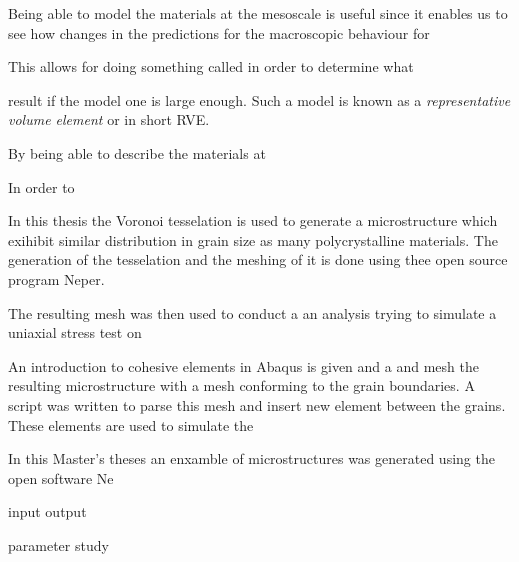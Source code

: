 \documentclass[introduction.tex]{subfiles}
\begin{document}
Being able to model the materials at the mesoscale is useful since it enables us to see how changes in the  predictions for the macroscopic behaviour for 

This allows for doing something called in order to determine what 

 result if the model one is large enough. Such a model is known as a \textit{representative volume element} or in short RVE.
 
 
By being able to describe the materials at 

In order to  

In this thesis the Voronoi tesselation is used to generate a microstructure which exihibit similar distribution in grain size as many polycrystalline materials. 
The generation of the tesselation and the meshing of it is done using thee open source program Neper.

The resulting mesh was then used to conduct a an analysis trying to simulate a uniaxial stress test on

An introduction to cohesive elements in Abaqus is given and a 
 and mesh the resulting microstructure with a mesh conforming to the grain boundaries. A script was written to parse this mesh
 and insert new element between the grains. These elements are used to simulate the 


In this Master's theses an enxamble of microstructures was generated using the open software Ne

input
output

parameter study
\end{document}
